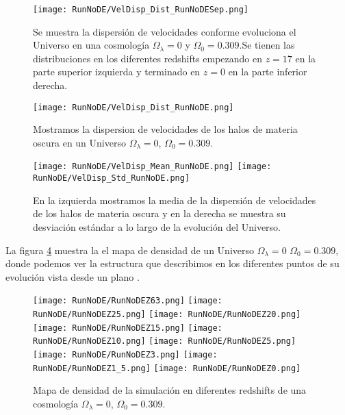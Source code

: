 \begin{figure}[H]
    \centering
    \texttt{[image: RunNoDE/VelDisp\_Dist\_RunNoDESep.png]}
    \caption[Dispersión de velocidades]{\footnotesize Se muestra la dispersión de velocidades conforme evoluciona el Universo en una cosmología $\Omega_\lambda = 0$ y $\Omega_0 = 0.309$.Se tienen las distribuciones en los diferentes redshifts empezando en $z=17$ en la parte superior izquierda y terminado en $z=0$ en la parte inferior derecha.}
    \label{fig:NoDE-VelDispDistSep}
\end{figure}

\begin{figure}[H]
    \centering
    \texttt{[image: RunNoDE/VelDisp\_Dist\_RunNoDE.png]}
    \caption[Distribución de la dispersión de velocidades]{\footnotesize Mostramos la dispersion de velocidades de los halos de materia oscura en un Universo $\Omega_\lambda = 0$, $\Omega_0 = 0.309$.}
    \label{fig:NoDE-VelDispDist}
\end{figure}

\begin{figure}[H]
    \centering
    \texttt{[image: RunNoDE/VelDisp\_Mean\_RunNoDE.png]}
    \texttt{[image: RunNoDE/VelDisp\_Std\_RunNoDE.png]}
    \caption[Media y desviación estándar de la dispersión de velocidades]{\footnotesize En la izquierda mostramos la media de la dispersión de velocidades de los halos de materia oscura y en la derecha se muestra su desviación estándar a lo largo de la evolución del Universo.}
    \label{fig:NoDE-VelDispStats}
\end{figure}

La figura \ref{fig:NoDE-DensityMap} muestra la el mapa de densidad de un Universo $\Omega_\lambda = 0$ $\Omega_0 = 0.309$, donde podemos ver la estructura que describimos  en los diferentes puntos de su evolución vista desde un plano .
\begin{figure}[H]
    \centering

    \texttt{[image: RunNoDE/RunNoDEZ63.png]}   %
    \texttt{[image: RunNoDE/RunNoDEZ25.png]}   %
    \texttt{[image: RunNoDE/RunNoDEZ20.png]}   %
    \\
    \texttt{[image: RunNoDE/RunNoDEZ15.png]}   %
    \texttt{[image: RunNoDE/RunNoDEZ10.png]}   %
    \texttt{[image: RunNoDE/RunNoDEZ5.png]}    %
    \\
    \texttt{[image: RunNoDE/RunNoDEZ3.png]}    %
    \texttt{[image: RunNoDE/RunNoDEZ1\_5.png]}  %
    \texttt{[image: RunNoDE/RunNoDEZ0.png]}    %
    \caption[Mapa de densidad en en diferentes redshift]{ \footnotesize Mapa de densidad de la simulación en diferentes redshifts de una cosmología $\Omega_\lambda = 0$, $\Omega_0 = 0.309$. }
    \label{fig:NoDE-DensityMap}
\end{figure}

